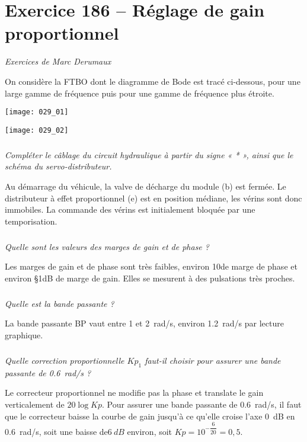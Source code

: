 \section*{Exercice 186 -- Réglage de gain proportionnel}
\setcounter{exo}{0}

\textit{Exercices de Marc Derumaux}

On considère la FTBO dont le diagramme de Bode est tracé ci-dessous, pour une large
gamme de fréquence puis pour une gamme de fréquence plus étroite.



\begin{center}
\texttt{[image: 029\_01]}
\end{center}


\begin{center}
\texttt{[image: 029\_02]}
\end{center}


\subparagraph{}\textit{Compléter le câblage du circuit hydraulique à partir du signe « * », ainsi que le schéma du servo-distributeur.}
\ifprof
\begin{corrige}
\end{corrige}
\else
\fi

Au démarrage du véhicule, la valve de décharge du module (b) est fermée. Le distributeur à effet proportionnel (e) est en position médiane, les vérins sont donc immobiles. La commande des vérins est initialement bloquée par une temporisation.

\subparagraph{}\textit{Quelle sont les valeurs des marges de gain et de phase ? }
\ifprof
\begin{corrige}
Les marges de gain et de phase sont très faibles, environ 10\degres de marge de phase et
environ \S{1}{dB} de marge de gain. Elles se
mesurent à des pulsations très proches.
\end{corrige}
\else
\fi


\subparagraph{}\textit{Quelle est la bande passante ?}
\ifprof
\begin{corrige}
La bande passante BP vaut entre 1 et \SI{2}{rad/s},
environ \SI{1,2}{rad/s} par lecture graphique.
\end{corrige}
\else
\fi

\subparagraph{}\textit{Quelle correction proportionnelle $Kp_1$ faut-il choisir pour assurer une bande passante de \SI{0,6}{rad/s} ?}
\ifprof
\begin{corrige}
Le correcteur proportionnel ne modifie pas la phase et translate le gain verticalement de
$20 \log Kp$. Pour assurer une bande passante de \SI{0,6}{rad/s}, il faut que le correcteur baisse la
courbe de gain jusqu'à ce qu'elle croise l'axe \SI{0}{dB} en \SI{0,6}{rad/s}, soit une baisse de$\SI{6}{dB}$
environ, soit $Kp=10^{-\dfrac{6}{20}}=0,5$.
\end{corrige}
\else
\fi

